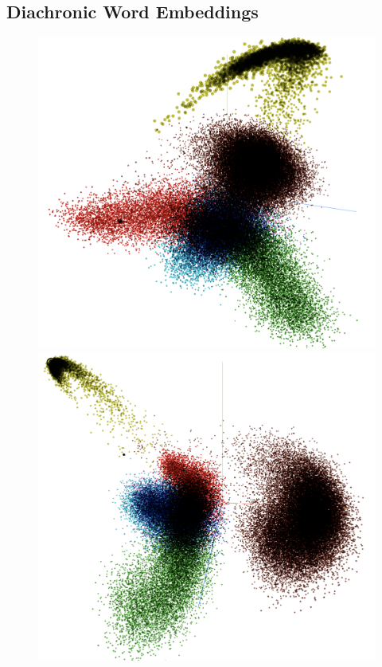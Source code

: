 \subsection{Diachronic Word Embeddings}
\begin{figure}[H]
  \centering
  \begin{threeparttable}
  \begin{minipage}[b]{0.45\linewidth}
    \includegraphics[width=\textwidth]{figures_new/from_old/pca_embedding_projector}
  \end{minipage}
  \quad
  \begin{minipage}[b]{0.45\linewidth}
    \includegraphics[width=\textwidth]{figures_new/from_old/pca_embedding_projector_2}

\end{minipage}
\end{threeparttable}
\end{figure}
